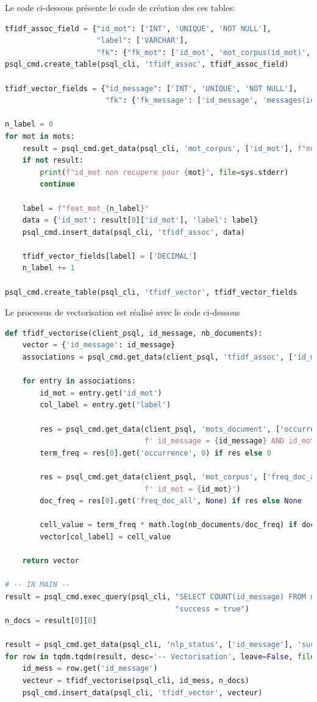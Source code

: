 \documentclass[a4paper,12pt]{article}
\begin{document}
			Le code ci-dessous présente le code de création des ces tables:
			\begin{lstlisting}[title=Préparation de la base vectorielle, language=python]
tfidf_assoc_field = {"id_mot": ['INT', 'UNIQUE', 'NOT NULL'],
                     "label": ['VARCHAR'],
                     "fk": {"fk_mot": ['id_mot', 'mot_corpus(id_mot)', 'CASCADE']}}
psql_cmd.create_table(psql_cli, 'tfidf_assoc', tfidf_assoc_field)

tfidf_vector_fields = {"id_message": ['INT', 'UNIQUE', 'NOT NULL'],
                       "fk": {'fk_message': ['id_message', 'messages(id_message)', 'CASCADE']}}
                       
n_label = 0
for mot in mots:
    result = psql_cmd.get_data(psql_cli, 'mot_corpus', ['id_mot'], f"mot LIKE '{mot}'")
    if not result:
        print(f"id_mot non recupere pour {mot}", file=sys.stderr)
        continue

    label = f"feat_mot_{n_label}"
    data = {'id_mot': result[0]['id_mot'], 'label': label}
    psql_cmd.insert_data(psql_cli, 'tfidf_assoc', data)

    tfidf_vector_fields[label] = ['DECIMAL']
    n_label += 1

psql_cmd.create_table(psql_cli, 'tfidf_vector', tfidf_vector_fields
			\end{lstlisting}
			
			
		Le processus de vectorisation est réalisé avec le code ci-dessous
			\begin{lstlisting}[title=Fonction de vectorisation et appel, language=python]
def tfidf_vectorise(client_psql, id_message, nb_documents):
    vector = {'id_message': id_message}
    associations = psql_cmd.get_data(client_psql, 'tfidf_assoc', ['id_mot', 'label'])

    for entry in associations:
        id_mot = entry.get('id_mot')
        col_label = entry.get('label')

        res = psql_cmd.get_data(client_psql, 'mots_document', ['occurrence'],
                                f' id_message = {id_message} AND id_mot = {id_mot}')
        term_freq = res[0].get('occurrence', 0) if res else 0

        res = psql_cmd.get_data(client_psql, 'mot_corpus', ['freq_doc_all'],
                                f' id_mot = {id_mot}')
        doc_freq = res[0].get('freq_doc_all', None) if res else None

        cell_value = term_freq * math.log(nb_documents/doc_freq) if doc_freq else 0
        vector[col_label] = cell_value

    return vector	

# -- IN MAIN --
result = psql_cmd.exec_query(psql_cli, "SELECT COUNT(id_message) FROM nlp_status WHERE "
                                       "success = true")
n_docs = result[0][0]

result = psql_cmd.get_data(psql_cli, 'nlp_status', ['id_message'], 'success = true')
for row in tqdm.tqdm(result, desc='-- Vectorisation', leave=False, file=sys.stdout, ascii=True):
    id_mess = row.get('id_message')
    vecteur = tfidf_vectorise(psql_cli, id_mess, n_docs)
    psql_cmd.insert_data(psql_cli, 'tfidf_vector', vecteur)		
			\end{lstlisting}
\end{document}
